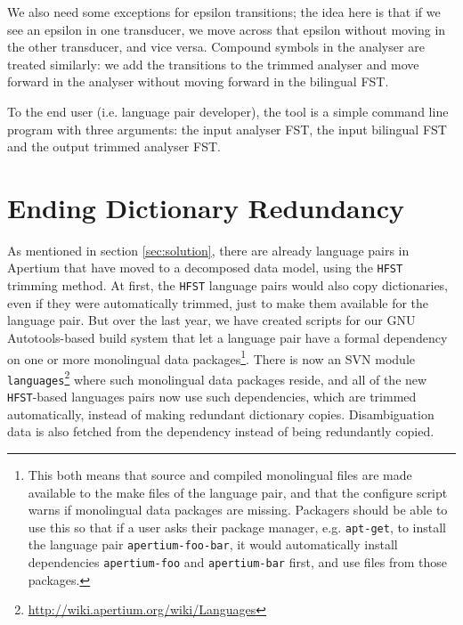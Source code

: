 \documentclass[10pt, a4paper]{article}
\newcommand{\tool}[1]{\texttt{#1}}
\begin{document}
We also need some exceptions for epsilon transitions; the idea here is
that if we see an epsilon in one transducer, we move across that
epsilon without moving in the other transducer, and vice versa.
Compound symbols in the analyser are treated similarly: we add the
transitions to the trimmed analyser and move forward in the analyser
without moving forward in the bilingual FST.

To the end user (i.e. language pair developer), the tool is a simple
command line program with three arguments: the input analyser FST, the
input bilingual FST and the output trimmed analyser FST.

\section{Ending Dictionary Redundancy}

As mentioned in section \ref{sec:solution}, there are already language
pairs in Apertium that have moved to a decomposed data model, using
the \tool{HFST} trimming method. At first, the \tool{HFST} language
pairs would also copy dictionaries, even if they were automatically
trimmed, just to make them available for the language pair.  But over
the last year, we have created scripts for our GNU Autotools-based
build system that let a language pair have a formal dependency on one
or more monolingual data packages\footnote{This both means that source
    and compiled monolingual files are made available to the make
    files of the language pair, and that the configure script warns if
    monolingual data packages are missing. Packagers should be able to
    use this so 
    that if a user asks their package manager, e.g. \tool{apt-get}, to
    install the language pair \tool{apertium-foo-bar}, it would
automatically install dependencies \tool{apertium-foo} and
\tool{apertium-bar} first, and use files from those packages.}.  There
is now an SVN module
\texttt{languages}\footnote{\href{http://wiki.apertium.org/wiki/Languages}{http://wiki.apertium.org/wiki/Languages}}
where such monolingual data packages reside, and all of the new
\tool{HFST}-based languages pairs now use such dependencies, which are
trimmed automatically, instead of making redundant dictionary copies.
Disambiguation data is also fetched from the dependency instead of
being redundantly copied.
\end{document}
